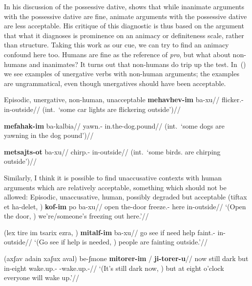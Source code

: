 In his discussion of the possessive dative, \cite{gafter14li} shows that while inanimate arguments with the possessive dative are fine, animate arguments with the possessive dative are less acceptable. His critique of this diagnostic is thus based on the argument that what it diagnoses is prominence on an animacy or definiteness scale, rather than structure. Taking this work as our cue, we can try to find an animacy confound here too. Humans are fine as the reference of \emph{pro}, but what about non-humans and inanimates? It turns out that non-humans do trip up the test. In~(\nextx) we see examples of unergative verbs with non-human arguments; the examples are ungrammatical, even though unergatives should have been acceptable.

\pex Episodic, unergative, non-human, unacceptable
		\a \ljudge{*} \begingl
			\gla \textbf{mehavhev-im} ba-xu{\ts}//
			\glb flicker.- in-outside//
			\glft (int.~`some car lights are flickering outside')//
		\endgl

		
		\a \ljudge{*} \begingl
			\gla \textbf{mefahak-im} ba-kalbia//
			\glb yawn.- in.the-dog.pound//
			\glft (int.~`some dogs are yawning in the dog pound')//
		\endgl

		\a \ljudge{*} \begingl
			\gla \textbf{metsajts-ot} ba-xu{\ts}//
			\glb chirp.- in-outside//
			\glft (int.~`some birds. are chirping outside')//
		\endgl		
\xe

Similarly, I think it is possible to find unaccusative contexts with human arguments which are relatively acceptable, something which should not be allowed:
\pex Episodic, unaccusative, human, possibly degraded but acceptable
	\a \begingl
		\gla (tiftax et ha-delet, ) \textbf{kof-im} po ba-xu{\ts}//
		\glb open  the-door {} freeze.- here in-outside//
		\glft `(Open the door, ) we're/someone's freezing out here.'//
	\endgl
	
		\a {} \begingl
		\gla (lex tire im tsarix ezra, ) \textbf{mitalf-im} ba-xu{\ts}//
		\glb go see if need help {} faint.- in-outside//
		\glft `(Go see if help is needed, ) people are fainting outside.'//
	\endgl
	
	\a {} \begingl
		\gla (axʃav adain xaʃux aval) be-ʃmone \textbf{mitorer-im} / \textbf{ji-torer-u}//
		\glb now still dark but in-eight wake.up.- {} -wake.up.-//
		\glft `(It's still dark now, ) but at eight o'clock everyone will wake up.'//
	\endgl
\xe



